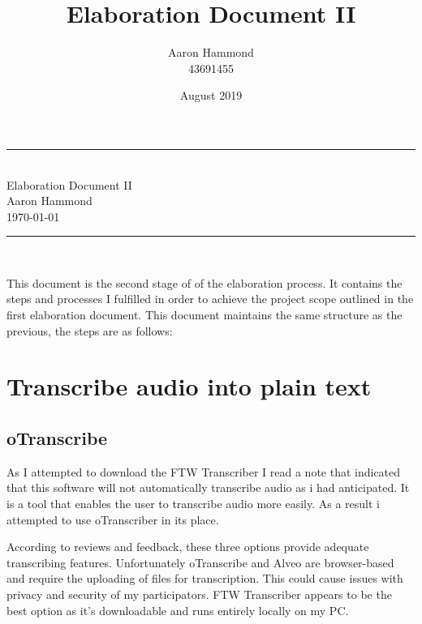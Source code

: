 \documentclass{article}
\title{Elaboration Document II}
\author{Aaron Hammond\\43691455}
\date{August 2019}
\newcommand\HRule{\rule{\textwidth}{1pt}} %
\begin{document}

\begin{titlepage}


\begin{center}
\HRule\\[0.4cm]
\huge{Elaboration Document II}\\[0.5cm]
\huge{Aaron Hammond}\\
\large{\today}\\[0.4cm]

\HRule \\[1cm]
\end{center}

\begin{justify}
\noindent This document is the second stage of of the elaboration process. It contains the steps and processes I fulfilled in order to achieve the project scope outlined in the first elaboration document. This document maintains the same structure as the previous, the steps are as follows:
\end{justify}


\def\contentsname{\empty} %
\tableofcontents

\end{titlepage}


\section{Transcribe audio into plain text}

\subsection{oTranscribe}
As I attempted to download the FTW Transcriber I read a note that indicated that this software will not automatically transcribe audio as i had anticipated. It is a tool that enables the user to transcribe audio more easily. As a result i attempted to use oTranscriber in its place.

According to reviews and feedback, these three options provide adequate transcribing features. Unfortunately oTranscribe and Alveo are browser-based and require the uploading of files for transcription. This could cause issues with privacy and security of my participators. FTW Transcriber appears to be the best option as it's downloadable and runs entirely locally on my PC.
\end{document}
